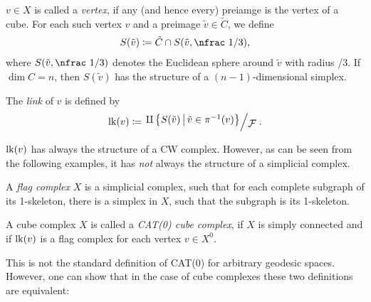 \begin{defin}[Link]
  \(v \in X\) is called a \emph{vertex}, if any (and hence every) preiamge is the vertex of a cube. For each such vertex \(v\) and a preimage \(\tilde v \in \tilde C\), we define
  \begin{align*}
    S(\tilde v) \coloneqq \tilde C \cap S(\tilde v, \text{\nfrac 1/3}),
  \end{align*}
  where \(S(\tilde v, \text{\nfrac 1/3})\) denotes the Euclidean sphere around \(\tilde v\) with radius {/3}. If \(\dim C = n\), then \(S(\tilde v)\) has the structure of a \((n-1)\)-dimensional simplex.

  The \emph{link} of \(v\) is defined by
  \begin{align*}
    \lk(v) \coloneqq \quot{\amalg \left\{S(\tilde v) \relmid \tilde v \in \pi^{-1}(v)\right\}}{\mathcal{F}}.
  \end{align*}
\end{defin}

\begin{rem}
  \(\operatorname{lk}(v)\) has always the structure of a CW complex. However, as can be seen from the following examples, it has \emph{not} always the structure of a simplicial complex.
\end{rem}

\begin{bsp}
\end{bsp}

\begin{defin}
  A \emph{flag complex} \(X\) is a simplicial complex, such that for each complete subgraph of its 1-skeleton, there is a simplex in \(X\), such that the subgraph is its 1-skeleton.
\end{defin}

\begin{defin}
  A cube complex \(X\) is called a \emph{CAT(0) cube complex}, if \(X\) is simply connected and if \(\operatorname{lk}(v)\) is a flag complex for each vertex \(v \in X^0\). 
\end{defin}

\begin{rem}
  This is not the standard definition of CAT(0) for arbitrary geodesic spaces. However, one can show that in the case of cube complexes these two definitions are equivalent:
\end{rem}

\begin{thm}
  
\end{thm}

